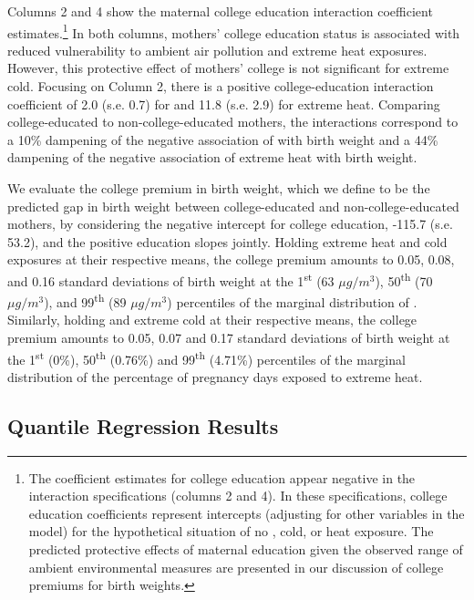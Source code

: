 Columns 2 and 4 show the maternal college education interaction coefficient estimates.\footnote{The coefficient estimates for college education appear negative in the interaction specifications (columns 2 and 4). In these specifications, college education coefficients represent intercepts (adjusting for other variables in the model) for the hypothetical situation of no \PARPMTEN, cold, or heat exposure. The predicted protective effects of maternal education given the observed range of ambient environmental measures are presented in our discussion of college premiums for birth weights.}
 In both columns, mothers' college education
status is associated with reduced vulnerability to ambient air pollution
and extreme heat exposures. However, this protective effect of 
mothers' college is not significant for extreme cold. Focusing on Column 2, there
is a positive college-education interaction coefficient of 2.0 (s.e.
0.7) for \PARPMTEN and 11.8 (s.e. 2.9) for extreme heat. Comparing
college-educated to non-college-educated mothers, the interactions
correspond to a 10\% dampening of the negative association of \PARPMTEN
with birth weight and a 44\% dampening of the negative association
of extreme heat with birth weight.

We evaluate the college premium in birth weight, which we define to be the predicted
gap in birth weight between college-educated and non-college-educated
mothers, by considering the negative intercept for college education,
-115.7 (s.e. 53.2), and the positive education slopes jointly. Holding
extreme heat and cold exposures at their respective means, the college
premium amounts to 0.05, 0.08, and 0.16 standard deviations of birth
weight at the 1\textsuperscript{st} (63 $\mu g/m^3$), 50\textsuperscript{th}
(70 $\mu g/m^3$), and 99\textsuperscript{th} (89 $\mu g/m^3$) percentiles of the
marginal distribution of \PARPMTEN. Similarly, holding \PARPMTEN and extreme cold
at their respective means, the college premium amounts to 0.05, 0.07 and
0.17 standard deviations of birth weight at the 1\textsuperscript{st} (0\%), 50\textsuperscript{th} (0.76\%) and
99\textsuperscript{th} (4.71\%) percentiles of the marginal
distribution of the percentage of pregnancy days exposed to extreme heat.

\hypertarget{quantile-regression-results}{%
\subsection{Quantile Regression
Results}\label{quantile-regression-results}}

